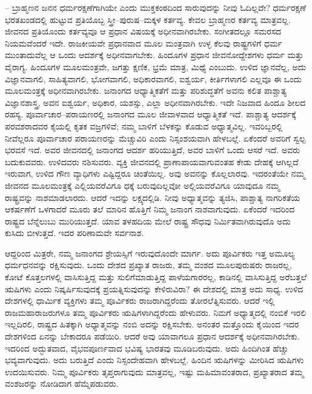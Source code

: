  – ಬ್ರಾಹ್ಮಣನ ಜನನ ಧರ್ಮರಕ್ಷಣೆಗಾಗಿಯೇ ಎಂದು ಮುಕ್ತಕಂಠದಿಂದ ಸಾರುವುದನ್ನು ನೀವು ಓದಿಲ್ಲವೇ? ಧರ್ಮರಕ್ಷಣೆ ಭರತಖಂಡದಲ್ಲಿ ಹುಟ್ಟುವ ಪ್ರತಿಯೊಬ್ಬ ಸ್ತ್ರೀ–ಪುರುಷ–ಮಕ್ಕಳ ಕರ್ತವ್ಯ. ಕೇವಲ ಬ್ರಾಹ್ಮಣರ ಕರ್ತವ್ಯ ಮಾತ್ರವಲ್ಲ. ಜೀವನದ ಪ್ರತಿಯೊಂದು ಕರ್ತವ್ಯವೂ ಆ ಪ್ರಧಾನ ವಿಷಯಕ್ಕೆ ಅಧೀನವಾಗಿರಬೇಕು. ಸಂಗೀತದಲ್ಲೂ ಸಮರಸದ ನಿಯಮವೆಂದರೆ ಇದೇ. ರಾಜಕೀಯವೇ ಪ್ರಧಾನವಾದ ಮೂಲ ಮಂತ್ರವಾಗಿ ಉಳ್ಳ ಕೆಲವು ರಾಷ್ಟ್ರಗಳಿಗೆ ಧರ್ಮ ಮುಂತಾದುವೆಲ್ಲ ಆ ಒಂದು ಆದರ್ಶಕ್ಕೆ ಅಧೀನವಾಗಬೇಕು. ಹಿಂದೂಗಳ ಪ್ರಧಾನ ಜೀವನೋದ್ದೇಶಗಳು ಧರ್ಮ ಮತ್ತು ವೈರಾಗ್ಯ. ಹಿಂದೂಗಳ ಮೂಲಮಂತ್ರವೇ, ಜಗತ್ತು ಕ್ಷಣಿಕ, ಭ್ರಮೆ ಮಾತ್ರ, ಮಿಥ್ಯೆ ಎಂಬುದು. ಉಳಿದ ಜ್ಞಾನವೆಲ್ಲ, ಅದು ವಿಜ್ಞಾನವಾಗಲಿ, ಸಾಹಿತ್ಯವಾಗಲಿ, ಭೋಗವಾಗಲಿ, ಅಧಿಕಾರವಾಗಲಿ, ಐಶ್ವರ್ಯ, ಕೀರ್ತಿಗಳಾಗಲಿ ಎಲ್ಲವೂ ಈ ಒಂದು ಮೂಲಮಂತ್ರಕ್ಕೆ ಅಧೀನವಾಗಿರಬೇಕು. ಜನಾಂಗದ ಆಧ್ಯಾತ್ಮಿಕತೆಗೆ ಮತ್ತು ಪರಿಶುದ್ಧತೆಗೆ ಅವನು ಕಲಿತ ಪಾಶ್ಚಾತ್ಯ ವಿಜ್ಞಾನಶಾಸ್ತ್ರ, ಅವನ ಐಶ್ವರ್ಯ, ಅಧಿಕಾರ, ಯಶಸ್ಸು, ಎಲ್ಲಾ ಅಧೀನವಾಗಿರಬೇಕು. ಇದೇ ನಿಜವಾದ ಹಿಂದೂ ಶೀಲದ ರಹಸ್ಯ. ಪೂರ್ವಾಚಾರ–ಪರಾಯಣರಲ್ಲಿ ಜನಾಂಗದ ಮೂಲ ಜೀವಾಳವಾದ ಆಧ್ಯಾತ್ಮಿಕತೆ ಇದೆ. ಪಾಶ್ಚಾತ್ಯ ಆದರ್ಶಕ್ಕೆ ಪರವಶರಾದವರ ಕೈಯಲ್ಲಿ ಕೃತಕ ವಜ್ರಗಳಿವೆ; ನಮ್ಮ ಬಾಳಿಗೆ ಬೆಳಕನ್ನು ಕೊಡುವ ಅಧ್ಯಾತ್ಮವಿಲ್ಲ. ಇವರಿಬ್ಬರಲ್ಲಿ ನೀವೆಲ್ಲರೂ ಪೂರ್ವಾಚಾರ ಪರಾಯಣರನ್ನು ಮೆಚ್ಚುವಿರಿ ಎಂದು ನಿಸ್ಸಂಶಯವಾಗಿ ಹೇಳಬಲ್ಲೆ. ಏಕೆಂದರೆ ಅವರಿಗೆ ಸ್ವಲ್ಪ ಭರವಸೆ ಇದೆ. ಅವರ ಜೀವನದಲ್ಲಿ ಜನಾಂಗದ ಆದರ್ಶ ಹರಿಯುತ್ತಿದೆ, ಅವರ ಬಾಳಿಗೆ ಒಂದು ಆಸರೆ ಇದೆ. ಅವರು ಬದುಕುವವರು. ಉಳಿದವರು ನಶಿಸುವರು. ವ್ಯಕ್ತಿ ಜೀವನದಲ್ಲಿ ಪ್ರಾಣಾಪಾಯವಾಗುವಂತಹ ಕೇಡು ದೇಹಕ್ಕೆ ಆಗಿಲ್ಲದೆ ಇರುವಾಗ, ಉಳಿದ ಗೌಣ ವ್ಯಾಧಿಗಳು ಎಷ್ಟಿದ್ದರೂ ಚಿಂತೆಯಿಲ್ಲ. ಅವು ಅವನನ್ನು ಕೊಲ್ಲಲಾರವು. ಇದರಂತೆಯೇ ನಮ್ಮ ಜೀವನದ ಮೂಲಮಂತ್ರಕ್ಕೆ ಎಲ್ಲಿಯವರೆವಿಗೂ ಧಕ್ಕೆ ಬರುವುದಿಲ್ಲವೋ ಅಲ್ಲಿಯವರೆವಿಗೂ ಯಾವುದೂ ನಮ್ಮ ರಾಷ್ಟ್ರವನ್ನು ನಾಶಮಾಡಲಾರದು. ಆದರೆ ಇದನ್ನು ಲಕ್ಷ್ಯದಲ್ಲಿಡಿ. ನೀವು ಅಧ್ಯಾತ್ಮವನ್ನು ತ್ಯಜಿಸಿ, ಪಾಶ್ಚಾತ್ಯ ನಾಗರಿಕತೆಯ ಆಕರ್ಷಣೆಗೆ ಒಳಗಾದರೆ ಮೂರು ತಲೆ ಮಾರಿನ ಹೊತ್ತಿಗೆ ನಿಮ್ಮ ಜನಾಂಗ ನಾಶವಾಗುವುದು. ಏಕೆಂದರೆ ಇದರಿಂದ ರಾಷ್ಟ್ರದ ಬೆನ್ನೆಲುಬು ಮುರಿಯುತ್ತದೆ. ಯಾವ ತಳಹದಿಯ ಮೇಲೆ ರಾಷ್ಟ್ರ ಸೌಧವು ನಿರ್ಮಿತವಾಗಿರುವುದೊ ಅದು ಕುಸಿದು ಬೀಳುತ್ತದೆ. ಇದರ ಪರಿಣಾಮವೇ ಸರ್ವನಾಶ. 

ಆದ್ದರಿಂದ ಮಿತ್ರರೇ, ನಮ್ಮ ಜನಾಂಗದ ಶ್ರೇಯಸ್ಸಿಗೆ ಇರುವುದೊಂದೇ ಮಾರ್ಗ. ಅದು ಪೂರ್ವಿಕರು ಇತ್ತ ಅಮೂಲ್ಯ ಧರ್ಮಧನವನ್ನು ರಕ್ಷಿಸುವುದು. ಒಂದು ದೇಶದ ಪ್ರಖ್ಯಾತ ರಾಜರು, ತಮ್ಮ ವಂಶದ ಮೂಲಪುರುಷರು ರಾಜರಲ್ಲ, ಕೋಟೆ ಕೊತ್ತಲಗಳಲ್ಲಿ ವಾಸಿಸುತ್ತಿದ್ದ ಮತ್ತು ಸುಲಿಗೆಮಾಡುತ್ತಿದ್ದ ಪಾಳೆಯಗಾರರಲ್ಲ, ಕಾಡಿನಲ್ಲಿ ವಾಸಿಸುತ್ತಿದ್ದ ಅರೆಬತ್ತಲೆ ಋಷಿಗಳು ಎಂದು ನಿಷ್ಕರ್ಷಿಸುವುದಕ್ಕೆ ಪ್ರಯತ್ನಿಸುವುದನ್ನು ಕೇಳಿರುವಿರಾ? ಈ ದೇಶದಲ್ಲಿ ಮಾತ್ರ ಅದು ಸಾಧ್ಯ. ಉಳಿದ ದೇಶಗಳಲ್ಲಿ ಧಾರ್ಮಿಕ ವ್ಯಕ್ತಿಗಳು ತಮ್ಮ ಪೂರ್ವಿಕರು ರಾಜರಾಗಿದ್ದರೆಂದು ತೋರಲೆತ್ನಿಸುವರು. ಆದರೆ ಇಲ್ಲಿ ರಾಜಮಹಾರಾಜರುಗಳೂ ತಮ್ಮ ಪೂರ್ವಿಕರು ಋಷಿಗಳಾಗಿದ್ದರೆಂದು ಹೇಳುವರು. ನಿಮಗೆ ಅಧ್ಯಾತ್ಮದಲ್ಲಿ ನಂಬಿಕೆ ಇರಲಿ ಇಲ್ಲದಿರಲಿ, ರಾಷ್ಟ್ರದ ಹಿತಕ್ಕಾಗಿ ಅಧ್ಯಾತ್ಮವನ್ನು ನಂಬಿ ಅದನ್ನು ರಕ್ಷಿಸಬೇಕು. ಅನಂತರ ಮತ್ತೊಂದು ಕೈಯಿಂದ ಇದರ ದೇಶಗಳಿಂದ ಏನನ್ನು ಬೇಕಾದರೂ ಪಡೆಯಿರಿ. ಆದರೆ ಅವು ಯಾವಾಗಲೂ ಪ್ರಧಾನ ಆದರ್ಶಕ್ಕೆ ಅಧೀನವಾಗಿರಬೇಕು. ಇದರಿಂದ ಅದ್ಭುತವಾದ, ವೈಭವಪೂರ್ಣವಾದ ಭವಿಷ್ಯ ಭಾರತವು ಮೂಡಿಬರುವುದು. ಅದು ಹಿಂದಿಗಿಂತ ಹೆಚ್ಚು ಭವ್ಯವಾಗುವುದು. ಅದು ಬರುತ್ತಿದೆ ಎಂದು ನಿಸ್ಸಂದೇಹವಾಗಿ ಹೇಳಬಲ್ಲೆ. ಹಿಂದಿನ ಋಷಿಗಳನ್ನು ಮೀರಿಸಿದ ಋಷಿಗಳು ಉದಯಿಸುವರು. ನಿಮ್ಮ ಪೂರ್ವಿಕರು ತೃಪ್ತರಾಗುವುದು ಮಾತ್ರವಲ್ಲ, ಇಷ್ಟು ಮಹಿಮಾವಂತರಾದ, ಪ್ರಖ್ಯಾತರಾದ ತಮ್ಮ ವಂಶಜರನ್ನು ನೋಡಿದಾಗ ಹೆಮ್ಮೆಪಡುವರು. 

